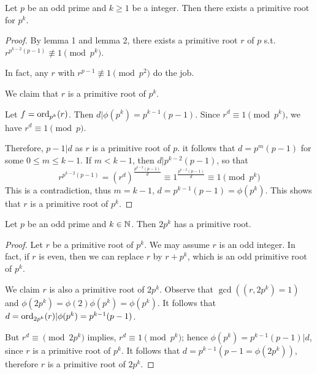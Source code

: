 \begin{theorem}
    Let $p$ be an odd prime and $k \geq 1$ be a integer. Then 
    there exists a primitive root for $p^k$.
\end{theorem}
\begin{proof}
    By lemma 1 and lemma 2, there exists a primitive root $r$ of $p$ s.t. 
    $r^{p^{k-2}(p-1)} \not\equiv 1 \pmod {p^k}$.

    In fact, any $r$ with $r^{p-1} \not\equiv 1 \pmod {p^2}$ do the job.
    
    We claim that $r$ is a primitive root of $p^k$.

    Let $f = \text{ord}_{p^k}(r)$. Then $d | \phi(p^k) = p^{k-1}(p-1)$.
    Since $r^d \equiv 1 \pmod {p^k}$, we have $r^d \equiv 1 \pmod p$.

    Therefore, $p - 1 | d$ as $r$ is a primitive root of $p$.
    it follows that $d = p^m(p-1)$ for some $0 \leq m \leq k-1$.
    If $m < k-1$, then $d | p^{k-2}(p-1)$, so that
    \[
        r^{p^{k-2}(p-1)} = {(r^d)}^{\frac{p^{k-2}(p-1)}{d}} \equiv 1^{\frac{p^{k-2}(p-1)}{d}} \equiv 1 \pmod {p^k}
    \]
    This is a contradiction, thus $m = k-1$, $d = p^{k-1}(p-1) = \phi(p^k)$.
    This shows that $r$ is a primitive root of $p^k$.
\end{proof}

\begin{corollary}
    Let $p$ be an odd prime and $k \in \mathbb{N}$. Then $2p^k$ has a primitive root.
\end{corollary}
\begin{proof}
    Let $r$ be a primitive root of $p^k$. We may assume
    $r$ is an odd integer.
    In fact, if $r$ is even, then we can replace $r$ by $r + p^k$, which is 
    an odd primitive root of $p^k$.

    We claim $r$ is also a primitive root of $2p^k$.
    Observe that $\gcd((r, 2p^k) = 1)$ and $\phi(2p^k) = \phi(2)\phi(p^k) = \phi(p^k)$.
    It follows that $d = \text{ord}_{2p^k}(r) | \phi(p^k) = p^{k-1}(p-1)$.

    But $r^d \equiv \pmod {2p^k}$ implies, $r^d \equiv 1 \pmod {p^k}$;
    hence $\phi(p^k) = p^{k-1}(p-1) | d$, since $r$ is a primitive root of $p^k$.
    It follows that $d = p^{k-1}(p-1 = \phi(2p^k))$, therefore $r$ is a primitive root of $2p^k$.
\end{proof}